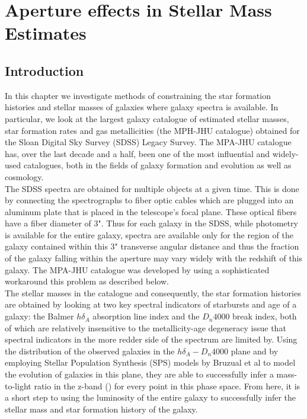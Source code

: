 \chapter{Aperture effects in Stellar Mass Estimates}

\label{ch:acm}
\newpage

\section{Introduction}

In this chapter we investigate methods of constraining the star formation histories and stellar masses of galaxies where galaxy spectra is available. In particular, we look at the largest galaxy catalogue of estimated stellar masses, star formation rates and gas metallicities (the MPH-JHU catalogue) obtained for the Sloan Digital Sky Survey (SDSS) Legacy Survey. The MPA-JHU catalogue has, over the last decade and a half, been one of the most influential and widely-used catalogues, both in the fields of galaxy formation and evolution as well as cosmology.\\
The SDSS spectra are obtained for multiple objects at a given time. This is done by connecting the spectrographs to fiber optic cables which are plugged into an aluminum plate that is placed in the telescope's focal plane. These optical fibers have a fiber diameter of $3$". Thus for each galaxy in the SDSS, while photometry is available for the entire galaxy, spectra are available only for the region of the galaxy contained within this $3$" transverse angular distance and thus the fraction of the galaxy falling within the aperture may vary widely with the redshift of this galaxy. The MPA-JHU catalogue was developed by using a sophisticated workaround this problem as described below.\\
The stellar masses in the catalogue and consequently, the star formation histories are obtained by looking at two key spectral indicators of starbursts and age of a galaxy: the Balmer $h\delta_{A}$ absorption line index and the $D_{n}4000$ break index, both of which are relatively insensitive to the metallicity-age degeneracy issue that spectral indicators in the more redder side of the spectrum are limited by. Using the distribution of the observed galaxies in the $h\delta_{A}-D_{n}4000$ plane and by employing Stellar Population Synthesis (SPS) models by Bruzual et al to model the evolution of galaxies in this plane, they are able to successfully infer a mass-to-light ratio in the z-band (\citep{kauffmann_stellar_2003}) for every point in this phase space. From here, it is a short step to using the luminosity of the entire galaxy to successfully infer the stellar mass and star formation history of the galaxy.\\

